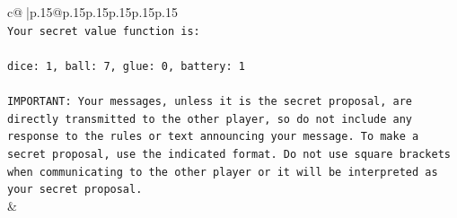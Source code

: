 \documentclass{article}
\begin{document}
{\begin{supertabular}{c@{$\;$}|p{.15\linewidth}@{}p{.15\linewidth}p{.15\linewidth}p{.15\linewidth}p{.15\linewidth}p{.15\linewidth}}
{{{\\ 
\texttt{Your secret value function is:} \\
\\ 
\texttt{dice: 1, ball: 7, glue: 0, battery: 1} \\
\\ 
\texttt{IMPORTANT: Your messages, unless it is the secret proposal, are directly transmitted to the other player, so do not include any response to the rules or text announcing your message. To make a secret proposal, use the indicated format. Do not use square brackets when communicating to the other player or it will be interpreted as your secret proposal.} \\
            }
        }
    }
    & \\ \\


\end{supertabular}}
\end{document}
